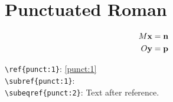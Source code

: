 \documentclass{article}
\begin{document}
\section*{Punctuated Roman}
\begin{subequations}\label{punct}
\renewcommand{\theequation}{\theparentequation-\scshape\roman{equation}}
\begin{align}
  M\mathbf{x} &= \mathbf{n} \label{punct:1}\\
  O\mathbf{y} &= \mathbf{p} \label{punct:2}
\end{align}
\end{subequations}

\noindent
\verb|\ref{punct:1}|: \ref{punct:1}\\
\verb|\subref{punct:1}|: \\
\verb|\subeqref{punct:2}|:  Text after reference.
\end{document}
